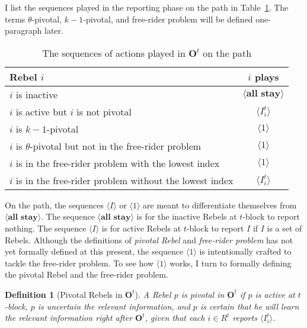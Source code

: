 \documentclass[12pt,letter]{article}
\newcommand{\Omicron}{\mathbf{O}}
\newtheorem{definition}{Definition}[section]
\theoremstyle{definition}
\theoremstyle{remark}
\theoremstyle{claim}
\begin{document}
I list the sequences played in the reporting phase on the path in Table~\ref{Table_msg_RP_path}. The terms $\theta$-pivotal, $k-1$-pivotal, and free-rider problem will be defined one-paragraph later.

\begin{table}[!htbp]
\caption{The sequences of actions played in $\Omicron^t$ on the path}
\label{Table_msg_RP_path}
\begin{center}
\begin{tabular}{l c}
Rebel $i$ & $i$ plays\\
\hline
\hline
$i$ is inactive				& $\langle \textbf{all stay} \rangle$  \\
$i$ is active but $i$ is not pivotal	 					 			& $\langle I^t_i \rangle$  \\
$i$ is $k-1$-pivotal	 					 			& $\langle 1 \rangle$  \\
$i$ is $\theta$-pivotal but not in the free-rider problem	 					 			& $\langle 1 \rangle$  \\
$i$ is in the free-rider problem with the lowest index	 					 			& $\langle 1 \rangle$  \\
$i$ is in the free-rider problem without the lowest index	 					 			& $\langle I^t_i \rangle$  \\
\hline
\end{tabular}
\end{center}
\end{table}

On the path, the sequences $\langle I \rangle$ or $\langle 1 \rangle$ are meant to differentiate themselves from $\langle \textbf{all stay} \rangle$. The sequence $\langle \textbf{all stay} \rangle$ is for the inactive Rebels at $t$-block to report nothing. The sequence $\langle I \rangle$ is for active Rebels at $t$-block to report $I$ if $I$ is a set of Rebels. Although the definitions of \textit{pivotal Rebel} and \textit{free-rider problem} has not yet formally defined at this present, the sequence $\langle 1 \rangle$ is intentionally crafted to tackle the free-rider problem. To see how $\langle 1 \rangle$ works, I turn to formally defining the {pivotal Rebel} and the {free-rider problem}. 

\begin{definition}[Pivotal Rebels in $\Omicron^t$]
A Rebel $p$ is pivotal in $\Omicron^t$ if $p$ is active at $t$-block, $p$ is uncertain the relevant information, and $p$ is certain that he will learn the relevant information right after $\Omicron^t$, given that each $i\in R^t$ reports $\langle I^t_i \rangle$.
\end{definition}
\end{document}
